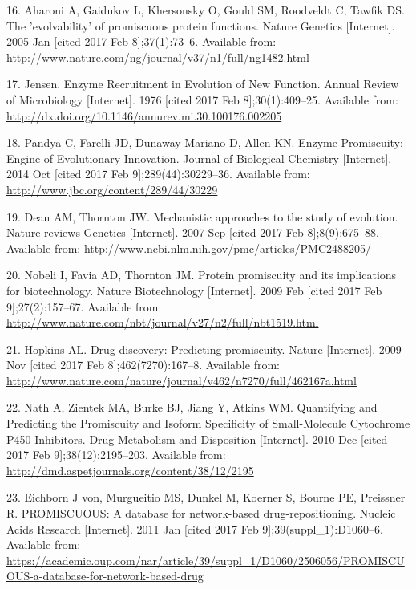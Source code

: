 \documentclass[12pt,twoside]{reedthesis}
\begin{document}
  \hypertarget{ref-aharoni_evolvability_2005}{}
  16. Aharoni A, Gaidukov L, Khersonsky O, Gould SM, Roodveldt C, Tawfik
  DS. The 'evolvability' of promiscuous protein functions. Nature Genetics
  {[}Internet{]}. 2005 Jan {[}cited 2017 Feb 8{]};37(1):73--6. Available
  from: \url{http://www.nature.com/ng/journal/v37/n1/full/ng1482.html}
  
  \hypertarget{ref-jensen_enzyme_1976}{}
  17. Jensen. Enzyme Recruitment in Evolution of New Function. Annual
  Review of Microbiology {[}Internet{]}. 1976 {[}cited 2017 Feb
  8{]};30(1):409--25. Available from:
  \url{http://dx.doi.org/10.1146/annurev.mi.30.100176.002205}
  
  \hypertarget{ref-pandya_enzyme_2014}{}
  18. Pandya C, Farelli JD, Dunaway-Mariano D, Allen KN. Enzyme
  Promiscuity: Engine of Evolutionary Innovation. Journal of Biological
  Chemistry {[}Internet{]}. 2014 Oct {[}cited 2017 Feb
  9{]};289(44):30229--36. Available from:
  \url{http://www.jbc.org/content/289/44/30229}
  
  \hypertarget{ref-dean_mechanistic_2007}{}
  19. Dean AM, Thornton JW. Mechanistic approaches to the study of
  evolution. Nature reviews Genetics {[}Internet{]}. 2007 Sep {[}cited
  2017 Feb 8{]};8(9):675--88. Available from:
  \url{http://www.ncbi.nlm.nih.gov/pmc/articles/PMC2488205/}
  
  \hypertarget{ref-nobeli_protein_2009}{}
  20. Nobeli I, Favia AD, Thornton JM. Protein promiscuity and its
  implications for biotechnology. Nature Biotechnology {[}Internet{]}.
  2009 Feb {[}cited 2017 Feb 9{]};27(2):157--67. Available from:
  \url{http://www.nature.com/nbt/journal/v27/n2/full/nbt1519.html}
  
  \hypertarget{ref-hopkins_drug_2009}{}
  21. Hopkins AL. Drug discovery: Predicting promiscuity. Nature
  {[}Internet{]}. 2009 Nov {[}cited 2017 Feb 8{]};462(7270):167--8.
  Available from:
  \url{http://www.nature.com/nature/journal/v462/n7270/full/462167a.html}
  
  \hypertarget{ref-nath_quantifying_2010}{}
  22. Nath A, Zientek MA, Burke BJ, Jiang Y, Atkins WM. Quantifying and
  Predicting the Promiscuity and Isoform Specificity of Small-Molecule
  Cytochrome P450 Inhibitors. Drug Metabolism and Disposition
  {[}Internet{]}. 2010 Dec {[}cited 2017 Feb 9{]};38(12):2195--203.
  Available from: \url{http://dmd.aspetjournals.org/content/38/12/2195}
  
  \hypertarget{ref-von_eichborn_promiscuous:_2011}{}
  23. Eichborn J von, Murgueitio MS, Dunkel M, Koerner S, Bourne PE,
  Preissner R. PROMISCUOUS: A database for network-based
  drug-repositioning. Nucleic Acids Research {[}Internet{]}. 2011 Jan
  {[}cited 2017 Feb 9{]};39(suppl\_1):D1060--6. Available from:
  \url{https://academic.oup.com/nar/article/39/suppl_1/D1060/2506056/PROMISCUOUS-a-database-for-network-based-drug}
  
\end{document}

